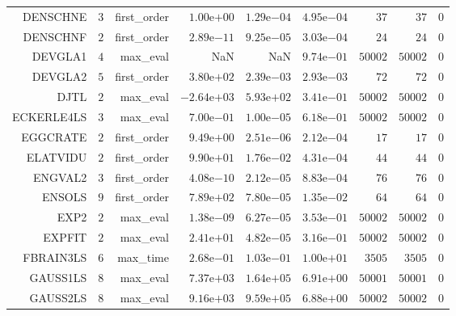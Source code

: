 \begin{longtable}{rrrrrrrrr}
DENSCHNE & \(     3\) & first\_order & \( 1.00\)e\(+00\) & \( 1.29\)e\(-04\) & \( 4.95\)e\(-04\) & \(    37\) & \(    37\) & \(     0\) \\
DENSCHNF & \(     2\) & first\_order & \( 2.89\)e\(-11\) & \( 9.25\)e\(-05\) & \( 3.03\)e\(-04\) & \(    24\) & \(    24\) & \(     0\) \\
DEVGLA1 & \(     4\) & max\_eval &       NaN &       NaN & \( 9.74\)e\(-01\) & \( 50002\) & \( 50002\) & \(     0\) \\
DEVGLA2 & \(     5\) & first\_order & \( 3.80\)e\(+02\) & \( 2.39\)e\(-03\) & \( 2.93\)e\(-03\) & \(    72\) & \(    72\) & \(     0\) \\
DJTL & \(     2\) & max\_eval & \(-2.64\)e\(+03\) & \( 5.93\)e\(+02\) & \( 3.41\)e\(-01\) & \( 50002\) & \( 50002\) & \(     0\) \\
ECKERLE4LS & \(     3\) & max\_eval & \( 7.00\)e\(-01\) & \( 1.00\)e\(-05\) & \( 6.18\)e\(-01\) & \( 50002\) & \( 50002\) & \(     0\) \\
EGGCRATE & \(     2\) & first\_order & \( 9.49\)e\(+00\) & \( 2.51\)e\(-06\) & \( 2.12\)e\(-04\) & \(    17\) & \(    17\) & \(     0\) \\
ELATVIDU & \(     2\) & first\_order & \( 9.90\)e\(+01\) & \( 1.76\)e\(-02\) & \( 4.31\)e\(-04\) & \(    44\) & \(    44\) & \(     0\) \\
ENGVAL2 & \(     3\) & first\_order & \( 4.08\)e\(-10\) & \( 2.12\)e\(-05\) & \( 8.83\)e\(-04\) & \(    76\) & \(    76\) & \(     0\) \\
ENSOLS & \(     9\) & first\_order & \( 7.89\)e\(+02\) & \( 7.80\)e\(-05\) & \( 1.35\)e\(-02\) & \(    64\) & \(    64\) & \(     0\) \\
EXP2 & \(     2\) & max\_eval & \( 1.38\)e\(-09\) & \( 6.27\)e\(-05\) & \( 3.53\)e\(-01\) & \( 50002\) & \( 50002\) & \(     0\) \\
EXPFIT & \(     2\) & max\_eval & \( 2.41\)e\(+01\) & \( 4.82\)e\(-05\) & \( 3.16\)e\(-01\) & \( 50002\) & \( 50002\) & \(     0\) \\
FBRAIN3LS & \(     6\) & max\_time & \( 2.68\)e\(-01\) & \( 1.03\)e\(-01\) & \( 1.00\)e\(+01\) & \(  3505\) & \(  3505\) & \(     0\) \\
GAUSS1LS & \(     8\) & max\_eval & \( 7.37\)e\(+03\) & \( 1.64\)e\(+05\) & \( 6.91\)e\(+00\) & \( 50001\) & \( 50001\) & \(     0\) \\
GAUSS2LS & \(     8\) & max\_eval & \( 9.16\)e\(+03\) & \( 9.59\)e\(+05\) & \( 6.88\)e\(+00\) & \( 50002\) & \( 50002\) & \(     0\) \\

\end{longtable}
